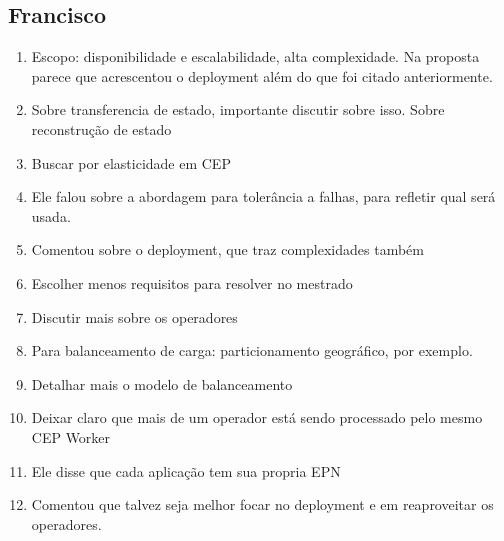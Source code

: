 \subsection{Francisco}
\begin{enumerate}
\item Escopo: disponibilidade e escalabilidade, alta complexidade. Na proposta parece que acrescentou o deployment além do que foi citado anteriormente.
\item Sobre transferencia de estado, importante discutir sobre isso. Sobre reconstrução de estado
\item Buscar por elasticidade em CEP
\item Ele falou sobre a abordagem para tolerância a falhas, para refletir qual será usada.
\item Comentou sobre o deployment, que traz complexidades também
\item Escolher menos requisitos para resolver no mestrado
\item Discutir mais sobre os operadores
\item Para balanceamento de carga: particionamento geográfico, por exemplo.
\item Detalhar mais o modelo de balanceamento
\item Deixar claro que mais de um operador está sendo processado pelo mesmo CEP Worker
\item Ele disse que cada aplicação tem sua propria EPN
\item Comentou que talvez seja melhor focar no deployment e em reaproveitar os operadores. 
\end{enumerate}

